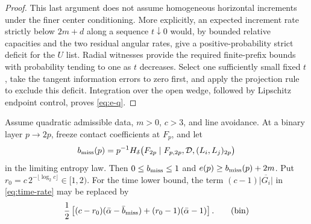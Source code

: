\begin{proof}
This last argument does not assume
homogeneous horizontal increments under
the finer center conditioning. More
explicitly, an expected increment rate
strictly below $2m+d$ along a sequence
$t\downarrow0$ would, by bounded
relative capacities and the two
residual angular rates, give a
positive-probability strict deficit
for the $U$ list. Radial witnesses
provide the required finite-prefix
bounds with probability tending to
one as $t$ decreases. Select one
sufficiently small fixed $t$, take
the tangent information errors to
zero first, and apply the projection
rule to exclude this deficit.
Integration over the open wedge,
followed by Lipschitz endpoint
control, proves \eqref{eq:e-q}.
\end{proof}

\begin{proposition}\label{int:binary}
Assume quadratic admissible data, $m>0$, $c>3$,
and line avoidance. At a binary layer $p\to2p$,
freeze contact coefficients at $F_p$, and let
\[
 b_{\rm miss}(p)=p^{-1}H_\delta
 \bigl(F_{2p}\mid F_{p,2p},\mathcal D,
                      (L_i,L_j)_{2p}\bigr)
\]
in the limiting entropy law. Then
$0\leq b_{\rm miss}\leq1$ and
$e(p)\geq b_{\rm miss}(p)+2m$.
Put $r_0=c\,2^{-\lfloor\log_2c\rfloor}\in[1,2)$.
For the time lower bound, the term
$(c-1)\overline{|G_i|}$ in
\eqref{eq:time-rate} may be replaced by
\begin{equation}
 \frac12\left[(c-r_0)(\bar\alpha-\bar b_{\rm miss})
                  +(r_0-1)(\bar\alpha-1)\right].
 \tag{bin}\label{eq:bin}
\end{equation}
\end{proposition}

